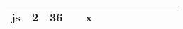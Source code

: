 \begin{table}[!ht]
\begin{tabular}{|l|l|l|l|l|l|l|l|l|l|l|l|}
js        & 2               & 36            &   & x &   &   &   &   &   &   &     \\ \hline
\end{tabular}
\end{table}

